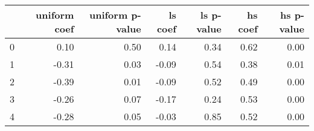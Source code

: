 \begin{tabular}{lrrrrrr}
\toprule
 & uniform coef & uniform p-value & ls coef & ls p-value & hs coef & hs p-value \\
\midrule
0 & 0.10 & 0.50 & 0.14 & 0.34 & 0.62 & 0.00 \\
1 & -0.31 & 0.03 & -0.09 & 0.54 & 0.38 & 0.01 \\
2 & -0.39 & 0.01 & -0.09 & 0.52 & 0.49 & 0.00 \\
3 & -0.26 & 0.07 & -0.17 & 0.24 & 0.53 & 0.00 \\
4 & -0.28 & 0.05 & -0.03 & 0.85 & 0.52 & 0.00 \\
\bottomrule
\end{tabular}
